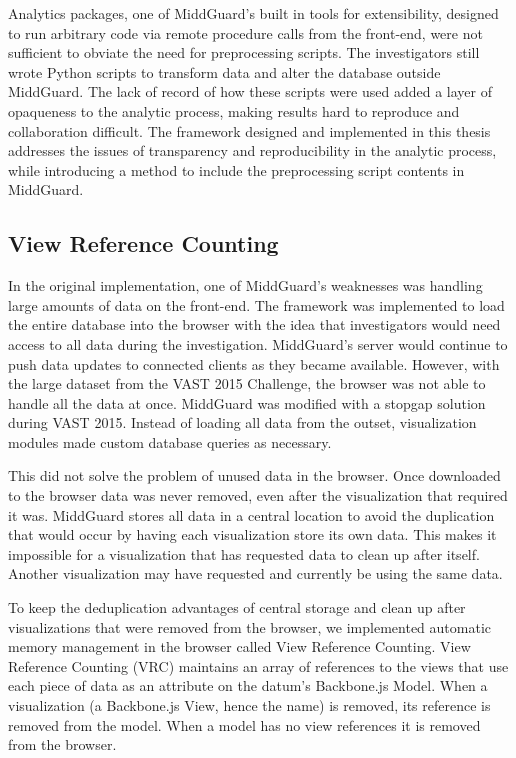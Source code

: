 \documentclass[midd]{thesis}
\begin{document}
Analytics packages, one of MiddGuard's built in tools for extensibility,
designed to run arbitrary code via remote procedure calls from the front-end,
were not sufficient to obviate the need for preprocessing scripts. The
investigators still wrote Python scripts to transform data and alter the
database outside MiddGuard. The lack of record of how these scripts were used
added a layer of opaqueness to the analytic process, making results hard to
reproduce and collaboration difficult. The framework designed and implemented in
this thesis addresses the issues of transparency and reproducibility in the
analytic process, while introducing a method to include the preprocessing script
contents in MiddGuard.

\subsection{View Reference Counting}

In the original implementation, one of MiddGuard's weaknesses was handling
large amounts of data on the front-end. The framework was implemented to load
the entire database into the browser with the idea that investigators would need
access to all data during the investigation. MiddGuard's server would continue
to push data updates to connected clients as they became available. However,
with the large dataset from the VAST 2015 Challenge, the browser was not able to
handle all the data at once. MiddGuard was modified with a stopgap solution
during VAST 2015. Instead of loading all data from the outset, visualization
modules made custom database queries as necessary.

This did not solve the problem of unused data in the browser. Once downloaded to
the browser data was never removed, even after the visualization that required
it was. MiddGuard stores all data in a central location to avoid the duplication
that would occur by having each visualization store its own data. This makes it
impossible for a visualization that has requested data to clean up after itself.
Another visualization may have requested and currently be using the same data.

To keep the deduplication advantages of central storage and clean up after
visualizations that were removed from the browser, we implemented automatic
memory management in the browser called View Reference Counting. View Reference
Counting (VRC) maintains an array of references to the views that use each piece
of data as an attribute on the datum's Backbone.js Model. When a visualization
(a Backbone.js View, hence the name) is removed, its reference is removed from
the model. When a model has no view references it is removed from the browser.
\end{document}
